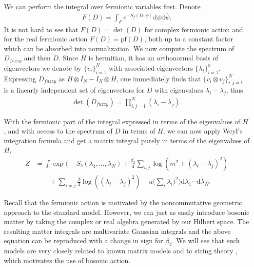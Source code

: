 \documentclass[10pt]{article}
\newcommand{\dif}{\mathrm{d}}
\theoremstyle{plain}
\theoremstyle{definition}
\theoremstyle{plain}
\begin{document}
We can perform the integral over fermionic variables first. Denote
\begin{align*}
	F(D) = \int_F e^{-S_f(D,\psi)}\dif\psi\dif\overline{\psi}.
\end{align*}
It is not hard to see that $F(D) = \det(D)$ for complex fermionic action and for the real fermionic action  $F(D) = \text{pf}({D})$, both up to a constant factor which can be absorbed into normalization. We now compute the spectrum of $D_{fuzzy}$ and then $D$. Since $H$ is hermitian, it has an orthonormal basis of eigenvectors we denote by $\{v_i\}_{i=1}^N$ with associated eigenvectors $\{\lambda_i\}_{i=1}^n$. Expressing $D_{fuzzy}$ as $H\otimes I_N - I_N\otimes H$, one immediately finds that $\{v_i\otimes v_j\}_{i,j=1}^N$ is a linearly independent set of eigenvectors for $D$ with eigenvalues $\lambda_i-\lambda_j$, thus 
\begin{align*}
	\det(D_{fuzzy}) = \prod_{i,j=1}^N (\lambda_i-\lambda_j).
\end{align*}



With the fermionic part of the integral expressed in terms of the eigenvalues of $H$, and with access to the spectrum of $D$ in terms of $H$, we can now apply Weyl's integration formula  and get a matrix integral purely in terms of the eigenvalues of $H$,
\begin{align*}
	Z &= \int \exp\bigg(-S_{b}(\lambda_{1},...,\lambda_{N})+ \frac{\beta_2}{4}\sum_{i,j}\log(m^2+(\lambda_i-\lambda_j)^2)\\ &\qquad+ \sum_{i\neq j}\frac{\beta}{4}\log((\lambda_i-\lambda_j)^2)-a\bigg(\sum_i \lambda_i\bigg)^2 \bigg)\dif\lambda_1\cdots\dif\lambda_N.
\end{align*}



Recall that the fermionic action is motivated by the noncommutative geometric approach to the standard model. However, we can just as easily introduce bosonic matter by taking the complex or real algebra generated by our Hilbert space. The resulting matter integrals are multivariate Gaussian integrals and the above equation can be reproduced with a change in sign for $\beta_{2}$. We will see that such models are very closely related to known matrix models and to string theory \cite{hoppe1989quantum,eynard1998iterative,kazakov1999d}, which motivates the use of bosonic action. 
\end{document}
